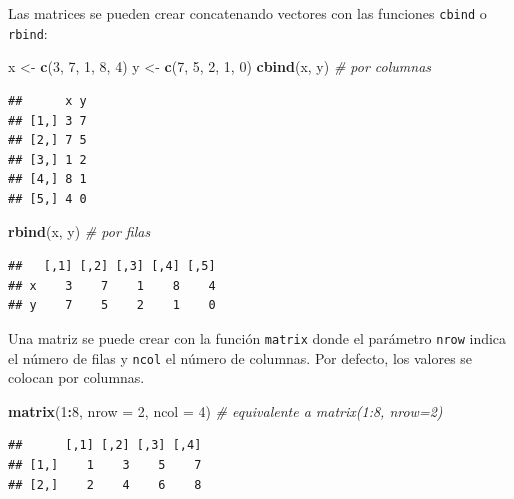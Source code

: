 \documentclass[]{book}
\newenvironment{Shaded}{\begin{snugshade}}{\end{snugshade}}
\newcommand{\KeywordTok}[1]{\textcolor[rgb]{0.13,0.29,0.53}{\textbf{#1}}}
\newcommand{\DataTypeTok}[1]{\textcolor[rgb]{0.13,0.29,0.53}{#1}}
\newcommand{\DecValTok}[1]{\textcolor[rgb]{0.00,0.00,0.81}{#1}}
\newcommand{\StringTok}[1]{\textcolor[rgb]{0.31,0.60,0.02}{#1}}
\newcommand{\CommentTok}[1]{\textcolor[rgb]{0.56,0.35,0.01}{\textit{#1}}}
\newcommand{\OperatorTok}[1]{\textcolor[rgb]{0.81,0.36,0.00}{\textbf{#1}}}
\newcommand{\NormalTok}[1]{#1}
\begin{document}
Las matrices se pueden crear concatenando vectores con las funciones
\texttt{cbind} o \texttt{rbind}:

\begin{Shaded}
\begin{Highlighting}[]
\NormalTok{x <-}\StringTok{ }\KeywordTok{c}\NormalTok{(}\DecValTok{3}\NormalTok{, }\DecValTok{7}\NormalTok{, }\DecValTok{1}\NormalTok{, }\DecValTok{8}\NormalTok{, }\DecValTok{4}\NormalTok{)}
\NormalTok{y <-}\StringTok{ }\KeywordTok{c}\NormalTok{(}\DecValTok{7}\NormalTok{, }\DecValTok{5}\NormalTok{, }\DecValTok{2}\NormalTok{, }\DecValTok{1}\NormalTok{, }\DecValTok{0}\NormalTok{)}
\KeywordTok{cbind}\NormalTok{(x, y)  }\CommentTok{# por columnas}
\end{Highlighting}
\end{Shaded}

\begin{verbatim}
##      x y
## [1,] 3 7
## [2,] 7 5
## [3,] 1 2
## [4,] 8 1
## [5,] 4 0
\end{verbatim}

\begin{Shaded}
\begin{Highlighting}[]
\KeywordTok{rbind}\NormalTok{(x, y)  }\CommentTok{# por filas}
\end{Highlighting}
\end{Shaded}

\begin{verbatim}
##   [,1] [,2] [,3] [,4] [,5]
## x    3    7    1    8    4
## y    7    5    2    1    0
\end{verbatim}

Una matriz se puede crear con la función \texttt{matrix} donde el
parámetro \texttt{nrow} indica el número de filas y \texttt{ncol} el
número de columnas. Por defecto, los valores se colocan por columnas.

\begin{Shaded}
\begin{Highlighting}[]
\KeywordTok{matrix}\NormalTok{(}\DecValTok{1}\OperatorTok{:}\DecValTok{8}\NormalTok{, }\DataTypeTok{nrow =} \DecValTok{2}\NormalTok{, }\DataTypeTok{ncol =} \DecValTok{4}\NormalTok{)  }\CommentTok{# equivalente a matrix(1:8, nrow=2)}
\end{Highlighting}
\end{Shaded}

\begin{verbatim}
##      [,1] [,2] [,3] [,4]
## [1,]    1    3    5    7
## [2,]    2    4    6    8
\end{verbatim}
\end{document}
